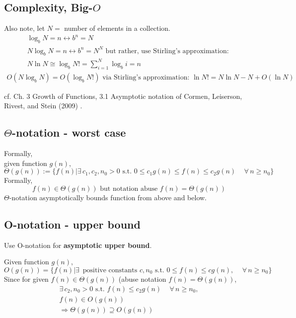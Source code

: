 \documentclass[10pt]{amsart}
\begin{document}
\begin{multicols*}{2}
\section{Complexity, Big-$O$}

Also note, let $N = $ number of elements in a collection.
\[
\begin{gathered}
	\log_b{N} = n \leftrightarrow b^n = N \\ 
 N \log_b{N} = n \leftrightarrow b^n = N^N \text{ but rather, use Stirling's approximation: } \\
 N \ln N \cong \log_b{N!} = \sum_{i=1}^N \log_b{i} = n  
\end{gathered}
\]
\[
\begin{gathered}
	O(N\log_b{N}) = O(\log_b{N!}) \text{ via Stirling's approximation: } \ln{N!} = N\ln{N} - N + O(\ln{N})
\end{gathered}
\]

cf. Ch. 3 Growth of Functions, 3.1 Asymptotic notation of Cormen, Leiserson, Rivest, and Stein (2009) \cite{CLRS2009}.

\subsection{$\Theta$-notation - worst case}


Formally, \\
given function $g(n)$, 
\begin{equation}
\Theta(g(n)) := \lbrace f(n) | \exists \, c_1, c_2, n_0 > 0 \text{ s.t. } 0 \leq c_1 g(n) \leq f(n) \leq c_2 g(n) \quad \, \forall \, n \geq n_0 \rbrace 
\end{equation}
Formally, \\
\[
f(n) \in \Theta (g(n)) \text{ but notation abuse } f(n) = \Theta(g(n))
\]
$\Theta$-notation asymptotically bounds function from above and below.

\subsection{O-notation - upper bound}

Use O-notation for \textbf{asymptotic upper bound}.

Given function $g(n)$, 
\begin{equation}
O(g(n)) = \lbrace f(n) | \exists \, \text{ positive constants } c, n_0 \text{ s.t. } 0 \leq f(n) \leq c g(n), \quad \, \forall \, n \geq n_0 \rbrace 
\end{equation}
Since for given $f(n) \in \Theta(g(n))$ (abuse notation $f(n) = \Theta(g(n))$, 
\[
\begin{gathered} 
\exists \, c_2, n_0 > 0 \text{ s.t. } f(n) \leq c_2 g(n) \quad \, \forall \, n \geq n_0, \\
f(n) \in O(g(n)) \\
\Longrightarrow \Theta(g(n)) \supseteq O(g(n))
\end{gathered}
\]


\end{multicols*}
\end{document}
